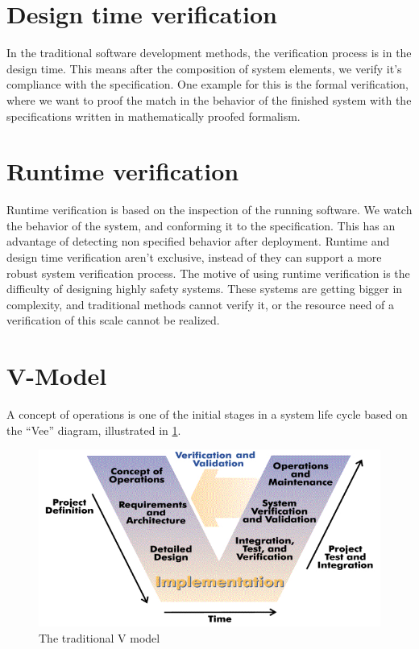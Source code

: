 \section{Design time verification}

In the traditional software development methods, the verification process is in the design time. This means after the composition of system elements, we verify it's compliance with the specification. One example for this is the formal verification, where we want to proof the match in the behavior of the finished system with the specifications written in mathematically proofed formalism.

\section{Runtime verification}

Runtime verification is based on the inspection of the running software. We watch the behavior of the system, and conforming it to the specification. This has an advantage of detecting non specified behavior after deployment. Runtime and design time verification aren't exclusive, instead of they can support a more robust system verification process. The motive of using runtime verification is the difficulty of designing highly safety systems. These systems are getting bigger in complexity, and traditional methods cannot verify it, or the resource need of a verification of this scale cannot be realized.

\section{V-Model}

A concept of operations is one of the initial stages in a system life cycle based on the “Vee” diagram, illustrated in \cref{fig:intro:vmodel}.

\begin{figure}[h]
	\centering
	\includegraphics[width=0.8\linewidth]{include/figures/chapter_1/VModel}
	\caption{The traditional V model \cite{vmodel}}
	\label{fig:intro:vmodel}
\end{figure}

